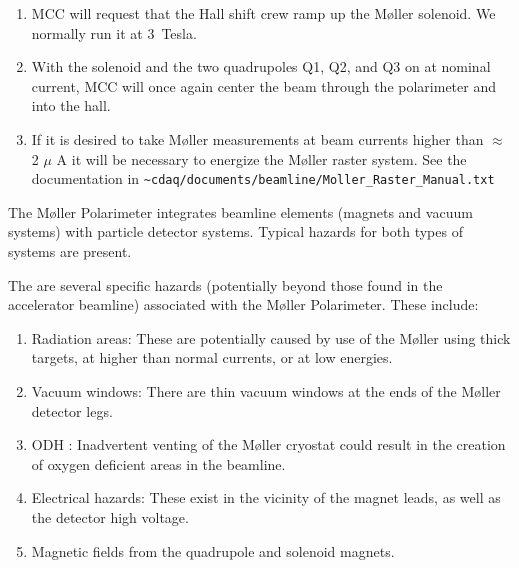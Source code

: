 {\begin{enumerate}
        \item MCC will request that the Hall shift crew ramp up the
	M\o ller solenoid. We normally run it at 3~Tesla.

        \item With the solenoid and the two quadrupoles Q1, Q2, and Q3 on
              at nominal current, MCC will once again center the beam
              through the polarimeter and into the hall.

	\item If it is desired to take M\o ller measurements at beam currents
	      higher than $\approx$ 2 $\mu$ A it will be necessary to energize
	      the M\o ller raster system. See the documentation in
              \nolinkurl{\~cdaq/documents/beamline/Moller\_Raster\_Manual.txt}
\end{enumerate}




\begin{safetyen}{0}{0}
%
%

The M\o ller Polarimeter integrates beamline elements (magnets and
vacuum systems) with particle detector systems. Typical hazards for
both types of systems are present.


The are several specific hazards (potentially beyond those found in
the accelerator beamline) associated with the M\o ller Polarimeter.
These include:
\begin{enumerate}
\item{Radiation areas: These are potentially caused by use of the M\o ller using thick targets, at higher than normal currents, or at low energies.}
\item{Vacuum windows: There are thin vacuum windows at the ends of the M\o ller detector legs.}
\item{ODH : Inadvertent venting of the M\o ller cryostat could result in the creation of oxygen deficient areas in the beamline.}
\item{Electrical hazards: These exist in the vicinity of the magnet leads, as well as the detector high voltage.}
\item{Magnetic fields from the quadrupole and solenoid magnets.}
\end{enumerate}


\end{safetyen}}
